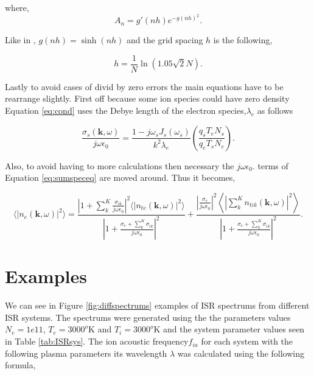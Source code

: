 \documentclass[10pt]{report}
\begin{document}
\noindent where,
\begin{equation}
\label{eq:anterm}
A_n = g'(nh)e^{-g(nh)^2}.
\end{equation}

\noindent Like in \cite{Ooi:2007jx}, $g(nh) = \sinh (nh)$ and the grid spacing $h$ is the following,

\begin{equation}
\label{eq:hterm}
h = \frac{1}{N}\ln(1.05\sqrt{2}N).
\end{equation} 


Lastly to avoid cases of divid by zero errors the main equations have to be rearrange slightly. First off because some ion species could have zero density Equation \ref{eq:cond} uses the Debye length of the electron species,$\lambda_e$ as follows

\begin{equation}
\label{eq:condnew}
\frac{\sigma_{s}(\mathbf{k},\omega)}{j\omega\epsilon_0} = \frac{1-j\omega_s J_s(\omega_s)}{k^2\lambda_e} \left(\frac{q_sT_eN_s}{q_eT_sN_e}\right).
\end{equation}

Also, to avoid having to more calculations then necessary the $j\omega\epsilon_0$. terms of Equation \ref{eq:sumspeceq} are moved around. Thus it becomes,

\begin{equation}
\label{eq:sumspeceqfinal}
\displaystyle \langle \left|n_e(\mathbf{k},\omega)\right|^2\rangle =  \frac{\left|1 +  \sum_k^K\frac{\sigma_{ik}}{j\omega\epsilon_0} \right|^2 \langle |n_{te}(\mathbf{k},\omega)|^2\rangle}{\left|1 +\frac{\sigma_e+ \sum_k^K\sigma_{ik}}{j\omega\epsilon_0} \right|^2} + \frac{\left| \frac{\sigma_e}{j\omega\epsilon_0} \right|^2\left \langle \left|\sum_k^Kn_{tik}(\mathbf{k},\omega)\right|^2\right\rangle}{\left|1 +\frac{\sigma_e+ \sum_k^K\sigma_{ik}}{j\omega\epsilon_0} \right|^2}.
\end{equation}

\section{Examples}
We can see in Figure \ref{fig:diffspectrums} examples of ISR spectrums from different ISR systems. The spectrums were generated using the the parameters values $N_e=1e11$, $T_e=3000^o$K and $T_i=3000^o$K and the system parameter values seen in Table \ref{tab:ISRsys}. The ion acoustic frequency$f_{ia}$ for each system with the following plasma parameters its wavelength $\lambda$ was calculated using the following formula,
\end{document}
